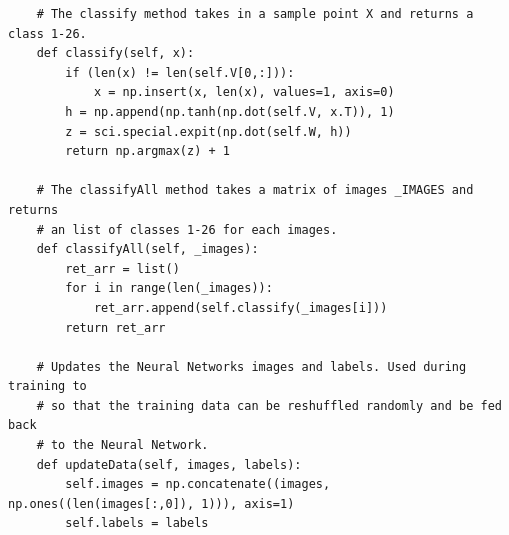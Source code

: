 \documentclass[12pt]{article}
\begin{document}
\begin{verbatim}
	# The classify method takes in a sample point X and returns a class 1-26.
	def classify(self, x):
		if (len(x) != len(self.V[0,:])):
			x = np.insert(x, len(x), values=1, axis=0)
		h = np.append(np.tanh(np.dot(self.V, x.T)), 1)
		z = sci.special.expit(np.dot(self.W, h))
		return np.argmax(z) + 1

	# The classifyAll method takes a matrix of images _IMAGES and returns
	# an list of classes 1-26 for each images.
	def classifyAll(self, _images):
		ret_arr = list()
		for i in range(len(_images)):
			ret_arr.append(self.classify(_images[i]))
		return ret_arr

	# Updates the Neural Networks images and labels. Used during training to
	# so that the training data can be reshuffled randomly and be fed back
	# to the Neural Network.
	def updateData(self, images, labels):
		self.images = np.concatenate((images, np.ones((len(images[:,0]), 1))), axis=1)
		self.labels = labels
\end{verbatim}
\newpage
\end{document}
